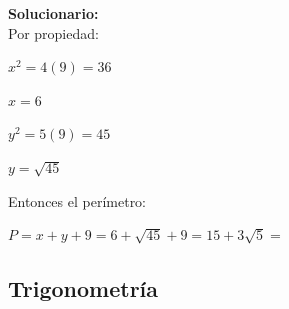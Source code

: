 \begin{enumerate}
	\vspace{2mm}
	\textbf{Solucionario:}\\
	
	Por propiedad:
	
	$x^2=4(9)=36$
	
	$x=6$
	
	$y^2=5(9)=45$
	
	$y=\sqrt{45}$
	
	Entonces el perímetro:
	
	$P=x+y+9=6+\sqrt{45}+9=15+3\sqrt{5}=$
	
	\vspace{6mm}
\end{enumerate}

\subsection*{Trigonometría}


